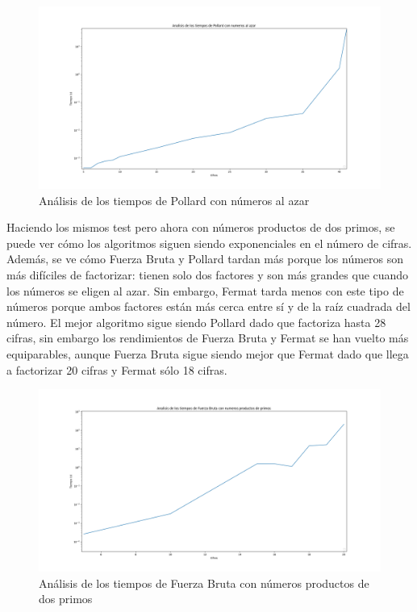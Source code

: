 \documentclass{article}
\begin{document}
    \begin{figure}[ht!]
        \centering
        \includegraphics[width=\linewidth]{Figure_5}
        \caption{Análisis de los tiempos de Pollard con números al azar}
        \label{fig:Figure_5}
    \end{figure}


    \newpage


    Haciendo los mismos test pero ahora con números productos de dos primos, se puede ver cómo los algoritmos siguen siendo exponenciales en el número de cifras. Además, se ve cómo Fuerza Bruta y Pollard tardan más porque los números son más difíciles de factorizar: tienen solo dos factores y son más grandes que cuando los números se eligen al azar. Sin embargo, Fermat tarda menos con este tipo de números porque ambos factores están más cerca entre sí y de la raíz cuadrada del número. 
    El mejor algoritmo sigue siendo Pollard dado que factoriza hasta 28 cifras, sin embargo los rendimientos de Fuerza Bruta y Fermat se han vuelto más equiparables, aunque Fuerza Bruta sigue siendo mejor que Fermat dado que llega a factorizar 20 cifras y Fermat sólo 18 cifras.

    \begin{figure}[ht!]
        \centering
        \includegraphics[width=\linewidth]{Figure_2}
        \caption{Análisis de los tiempos de Fuerza Bruta con números productos de dos primos}
        \label{fig:Figure_2}
    \end{figure}
\end{document}
